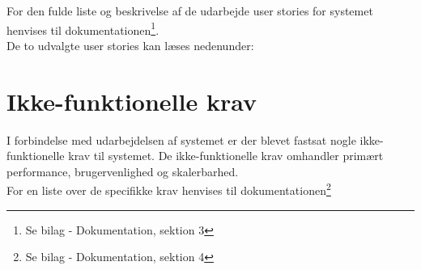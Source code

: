 \noindent For den fulde liste og beskrivelse af de udarbejde user stories for systemet henvises til dokumentationen\footnote{Se bilag - Dokumentation, sektion 3}.\\
De to udvalgte user stories kan læses nedenunder:




\section{Ikke-funktionelle krav}
I forbindelse med udarbejdelsen af systemet er der blevet fastsat nogle ikke-funktionelle krav til systemet. De ikke-funktionelle krav omhandler primært performance, brugervenlighed og skalerbarhed.\\ For en liste over de specifikke krav henvises til dokumentationen\footnote{Se bilag - Dokumentation, sektion 4}
